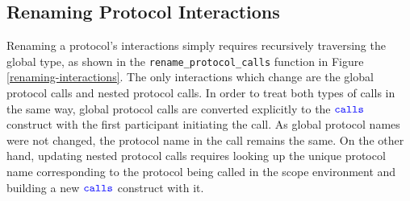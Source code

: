\documentclass[12pt,twoside]{report}
\begin{document}
\subsection{Renaming Protocol Interactions}

Renaming a protocol's interactions simply requires recursively traversing the global type, as shown in the \texttt{rename\_protocol\_calls} function in Figure \ref{renaming-interactions}. The only interactions which change are the global protocol calls and nested protocol calls. In order to treat both types of calls in the same way, global protocol calls are converted explicitly to the ${\color{blue}\mathtt{calls}}$ construct with the first participant initiating the call. As global protocol names were not changed, the protocol name in the call remains the same. On the other hand, updating nested protocol calls requires looking up the unique protocol name corresponding to the protocol being called in the scope environment and building a new ${\color{blue}\mathtt{calls}}$ construct with it.\\
\end{document}

